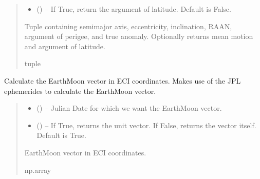 \documentclass[letterpaper,10pt,english]{sphinxmanual}
\begin{document}
\begin{fulllineitems}
\begin{quote}
\begin{description}
\begin{itemize}
\item {} 
\sphinxAtStartPar
{} () – If True, return the argument of latitude. Default is False.

\end{itemize}

\sphinxAtStartPar
Tuple containing semi\sphinxhyphen{}major axis, eccentricity, inclination,
RAAN, argument of perigee, and true anomaly. Optionally returns
mean motion and argument of latitude.

\sphinxAtStartPar
tuple

\end{description}\end{quote}

\end{fulllineitems}


\begin{fulllineitems}
\label{\detokenize{fspsim.utils:fspsim.utils.Conversions.earth_moon_vec}}
\pysigstartsignatures
{}
\pysigstopsignatures
\sphinxAtStartPar
Calculate the Earth\sphinxhyphen{}Moon vector in ECI coordinates.
Makes use of the JPL ephemerides to calculate the Earth\sphinxhyphen{}Moon vector.
\begin{quote}\begin{description}
\begin{itemize}
\item {} 
\sphinxAtStartPar
{} () – Julian Date for which we want the Earth\sphinxhyphen{}Moon vector.

\item {} 
\sphinxAtStartPar
{} () – If True, returns the unit vector. If False, returns the vector itself. Default is True.

\end{itemize}

\sphinxAtStartPar
Earth\sphinxhyphen{}Moon vector in ECI coordinates.

\sphinxAtStartPar
np.array

\end{description}\end{quote}

\end{fulllineitems}
\end{document}

